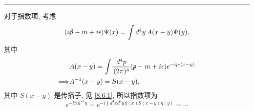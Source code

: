 \begin{itemize}
\begin{tcolorbox}[title=calculation:]
		\noindent\rule[0.5ex]{\linewidth}{0.5pt} %
		
		对于指数项, 考虑
		\begin{equation}
			(i \cancel{\partial} - m + i \epsilon) \Psi(x) = \int d^4 y \, A(x - y) \Psi(y),
		\end{equation}
		其中
		\begin{align}
			& A(x - y) = \int \frac{d^4 p}{(2 \pi)^4} (\cancel{p} - m + i \epsilon) e^{- i p \cdot (x - y)} \notag \\
			\Longrightarrow & A^{- 1}(x - y) = S(x - y),
		\end{align}
		其中 $S(x - y)$ 是传播子, 见 \eqref{8.6.1}, 所以指数项为
		\begin{equation}
			e^{- i \bar{\eta} A^{- 1} \eta} = e^{- i \int d^4 x d^4 y \, \bar{\eta}(x) S(x - y) \eta(y)} = \cdots
		\end{equation}
	\end{tcolorbox}
\end{itemize}

